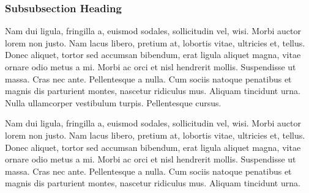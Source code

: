 \documentclass[11pt]{penrose}
\begin{document}

\subsubsection{Subsubsection Heading}
Nam dui ligula, fringilla a, euismod sodales, sollicitudin vel, wisi. Morbi auctor lorem non justo. Nam lacus libero, pretium at, lobortis vitae, ultricies et, tellus. Donec aliquet, tortor sed accumsan bibendum, erat ligula aliquet magna, vitae ornare odio metus a mi. Morbi ac orci et nisl hendrerit mollis. Suspendisse ut massa. Cras nec ante. Pellentesque a nulla. Cum sociis natoque penatibus et magnis dis parturient montes, nascetur ridiculus mus. Aliquam tincidunt urna. Nulla ullamcorper vestibulum turpis. Pellentesque cursus.

Nam dui ligula, fringilla a, euismod sodales, sollicitudin vel, wisi. Morbi auctor lorem non justo. Nam lacus libero, pretium at, lobortis vitae, ultricies et, tellus. Donec aliquet, tortor sed accumsan bibendum, erat ligula aliquet magna, vitae ornare odio metus a mi. Morbi ac orci et nisl hendrerit mollis. Suspendisse ut massa. Cras nec ante. Pellentesque a nulla. Cum sociis natoque penatibus et magnis dis parturient montes, nascetur ridiculus mus. Aliquam tincidunt urna.




\end{document}
